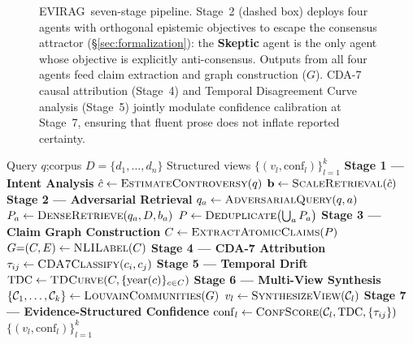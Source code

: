 \documentclass[11pt]{article}
\newcommand{\system}{\textsc{EVIRAG}\xspace}
\begin{document}
\begin{figure}[t]
{}%
\caption{\system\ seven-stage pipeline.  Stage~2 (dashed box) deploys four
agents with orthogonal epistemic objectives to escape the consensus attractor
(\S\ref{sec:formalization}): the \textbf{Skeptic} agent is the only agent
whose objective is explicitly anti-consensus.  Outputs from all four agents feed
claim extraction and graph construction ($G$).  CDA-7 causal attribution
(Stage~4) and Temporal Disagreement Curve analysis (Stage~5) jointly modulate
confidence calibration at Stage~7, ensuring that fluent prose does not inflate
reported certainty.}
\label{fig:architecture}
\end{figure}

\begin{algorithm}[t]
\footnotesize
\setlength{\baselineskip}{0.92\baselineskip}
\caption{\system\ Seven-Stage Inference Pipeline}
\label{alg:evirag}
\begin{algorithmic}[1]
\Require Query $q$;\enspace corpus $D=\{d_1,\ldots,d_n\}$
\Ensure Structured views $\{(v_l,\mathrm{conf}_l)\}_{l=1}^{k}$
\Statex \textbf{Stage 1 --- Intent Analysis}
\State $\hat{c} \gets \textsc{EstimateControversy}(q)$
\State $\mathbf{b} \gets \textsc{ScaleRetrieval}(\hat{c})$
\Statex \textbf{Stage 2 --- Adversarial Retrieval}
  \State $q_a \gets \textsc{AdversarialQuery}(q,a)$
  \State $P_a \gets \textsc{DenseRetrieve}(q_a, D, b_a)$
\EndFor
\State $P \gets \textsc{Deduplicate}\bigl(\textstyle\bigcup_a P_a\bigr)$
\Statex \textbf{Stage 3 --- Claim Graph Construction}
\State $C \gets \textsc{ExtractAtomicClaims}(P)$
\State $G{=}(C,E) \gets \textsc{NLILabel}(C)$
\Statex \textbf{Stage 4 --- CDA-7 Attribution}
  \State $\tau_{ij} \gets \textsc{CDA7Classify}(c_i,c_j)$
\EndFor
\Statex \textbf{Stage 5 --- Temporal Drift}
\State $\mathrm{TDC} \gets \textsc{TDCurve}(C,\{\mathrm{year}(c)\}_{c\in C})$
\Statex \textbf{Stage 6 --- Multi-View Synthesis}
\State $\{\mathcal{C}_1,\ldots,\mathcal{C}_k\} \gets \textsc{LouvainCommunities}(G)$
  \State $v_l \gets \textsc{SynthesizeView}(\mathcal{C}_l)$
\EndFor
\Statex \textbf{Stage 7 --- Evidence-Structured Confidence}
  \State $\mathrm{conf}_l \gets \textsc{ConfScore}(\mathcal{C}_l,\mathrm{TDC},\{\tau_{ij}\})$
\EndFor
\State \Return $\{(v_l,\mathrm{conf}_l)\}_{l=1}^{k}$
\end{algorithmic}
\end{algorithm}
\end{document}
